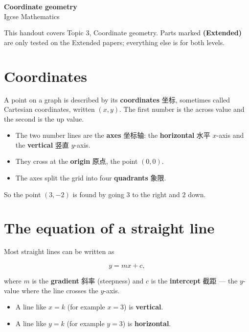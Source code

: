 \documentclass[11pt]{article}
\begin{document}
\begin{center}
  {\LARGE\bfseries Coordinate geometry}\\[0.35em]
  {\large Igcse Mathematics}
\end{center}
\vspace{0.6em}

This handout covers Topic 3, Coordinate geometry. Parts marked \textbf{(Extended)} are only tested on the Extended papers; everything else is for both levels.

\section*{Coordinates}

A point on a graph is described by its \textbf{coordinates} 坐标, sometimes called Cartesian coordinates, written $(x, y)$. The first number is the across value and the second is the up value.

\begin{itemize}
\item The two number lines are the \textbf{axes} 坐标轴: the \textbf{horizontal} 水平 $x$-axis and the \textbf{vertical} 竖直 $y$-axis.

\item They cross at the \textbf{origin} 原点, the point $(0, 0)$.

\item The axes split the grid into four \textbf{quadrants} 象限.

\end{itemize}

So the point $(3, -2)$ is found by going $3$ to the right and $2$ down.

\section*{The equation of a straight line}

Most straight lines can be written as

\[
y = mx + c,
\]

where $m$ is the \textbf{gradient} 斜率 (steepness) and $c$ is the \textbf{intercept} 截距 — the $y$-value where the line crosses the $y$-axis.

\begin{itemize}
\item A line like $x = k$ (for example $x = 3$) is \textbf{vertical}.

\item A line like $y = k$ (for example $y = 3$) is \textbf{horizontal}.

\end{itemize}
\end{document}

